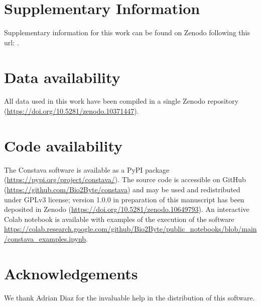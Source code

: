 \section*{Supplementary Information}
Supplementary information for this work can be found on Zenodo following this url: .

\section*{Data availability}

All data used in this work have been compiled in a single Zenodo repository (\url{https://doi.org/10.5281/zenodo.10371447}).


\section*{Code availability}

The Constava software is available as a PyPI package (\url{https://pypi.org/project/constava/}). The source code is accessible on GitHub  (\url{https://github.com/Bio2Byte/constava}) and may be used and redistributed under GPLv3 license; version 1.0.0 in preparation of this manuscript has been deposited in Zenodo (\url{https://doi.org/10.5281/zenodo.10649793}). An interactive Colab notebook is available with examples of the execution of the software \url{https://colab.research.google.com/github/Bio2Byte/public_notebooks/blob/main/constava_examples.ipynb}.


\section*{Acknowledgements}

We thank Adrian Diaz for the invaluable help in the distribution of this software. 



